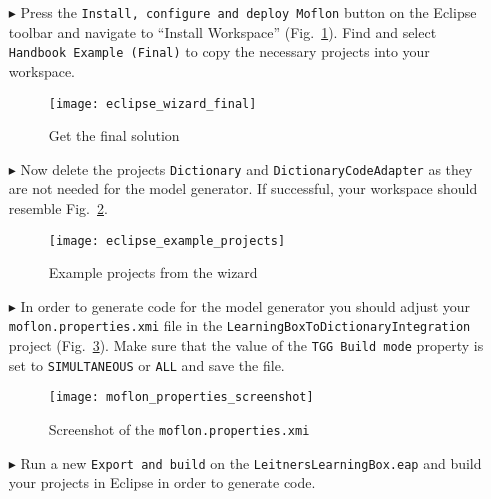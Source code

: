 \begin{itemize}
\renewcommand\figurename{Figure}
\item[$\blacktriangleright$] Press the \texttt{Install, configure and deploy Moflon} button on the Eclipse toolbar and navigate to ``Install Workspace''
(Fig.~\ref{eclipse:finalSolutionWizard}). Find and select \texttt{Handbook Example (Final)} to copy the necessary projects into your workspace.

\vspace{0.5cm}

\begin{figure}[htbp]
\begin{center}
  \texttt{[image: eclipse\_wizard\_final]}
  \caption{Get the final solution}
  \label{eclipse:finalSolutionWizard}
\end{center}
\end{figure}

\item[$\blacktriangleright$] Now delete the projects \texttt{Dictionary} and \texttt{DictionaryCodeAdapter} as they are not needed for the model generator. 
If successful, your workspace should resemble Fig.~\ref{eclipse:loadedDictionaryMetamodel}. 


\begin{figure}[htbp] 
\renewcommand\figurename{Figure}
\begin{center}
  \texttt{[image: eclipse\_example\_projects]}
  \caption{Example projects from the wizard}
  \label{eclipse:loadedDictionaryMetamodel}
\end{center}
\end{figure}


\item[$\blacktriangleright$] In order to generate code for the model generator you should adjust your \texttt{moflon.properties.xmi} file in the \texttt{LearningBoxToDictionaryIntegration} project (Fig.~\ref{fig:moflon_properties_screenshot}).
Make sure that the value of the \texttt{TGG Build mode}
property is set to \texttt{SIMULTANEOUS} or \texttt{ALL} and save the file.


\begin{figure}[h]
\renewcommand\figurename{Figure}
\centering 
\texttt{[image: moflon\_properties\_screenshot]}
\caption{Screenshot of the \texttt{moflon.properties.xmi}}
\label{fig:moflon_properties_screenshot}
\end{figure}

\item[$\blacktriangleright$] Run a new \texttt{Export and build} on the \texttt{LeitnersLearningBox.eap} and build your projects in Eclipse in order to generate code. 


\end{itemize}
 
